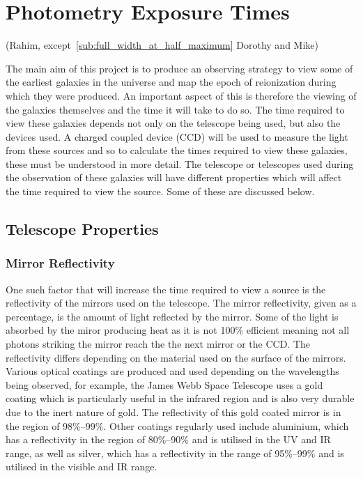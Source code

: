 
\section{Photometry Exposure Times} %
\label{sec:exposure_times}
(Rahim, except~\ref{sub:full_width_at_half_maximum} Dorothy and Mike)

	The main aim of this project is to produce an observing strategy to view some of the earliest galaxies in the universe and map the epoch of reionization during which they were produced. An important aspect of this is therefore the viewing of the galaxies themselves and the time it will take to do so. The time required to view these galaxies depends not only on the telescope being used, but also the devices used. A charged coupled device (CCD) will be used to measure the light from these sources and so to calculate the times required to view these galaxies, these must be understood in more detail. The telescope or telescopes used during the observation of these galaxies will have different properties which will affect the time required to view the source. Some of these are discussed below.

	\subsection{Telescope Properties} %
	\label{sub:telescope_properties}
		\subsubsection{Mirror Reflectivity} %
		\label{ssub:mirror_reflectivity}
			One such factor that will increase the time required to view a source is the reflectivity of the mirrors used on the telescope. The mirror reflectivity, given as a percentage, is the amount of light reflected by the mirror. Some of the light is absorbed by the miror producing heat as it is not 100\% efficient meaning not all photons striking the mirror reach the the next mirror or the CCD. The reflectivity differs depending on the material used on the surface of the mirrors. Various optical coatings are produced and used depending on the wavelengths being observed, for example, the James Webb Space Telescope uses a gold coating which is particularly useful in the infrared region and is also very durable due to the inert nature of gold. The reflectivity of this gold coated mirror is in the region of 98\%--99\%\cite{Quantum_Coatings_Incorporated}. Other coatings regularly used include aluminium, which has a reflectivity in the region of 80\%--90\% and is utilised in the UV and IR range, as well as silver, which has a reflectivity in the range of 95\%--99\% and is utilised in the visible and IR range.

